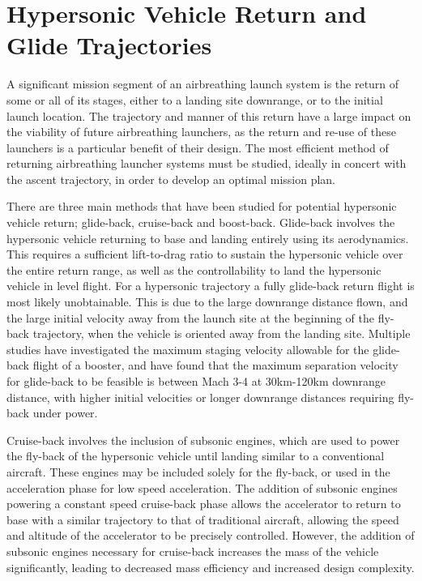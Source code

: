 \section{Hypersonic Vehicle Return and Glide Trajectories}


A significant mission segment of an airbreathing launch system is the return of some or all of its stages, either to a landing site downrange, or to the initial launch location. The trajectory and manner of this return have a large impact on the viability of future airbreathing launchers, as the return and re-use of these launchers is a particular benefit of their design\cite{Preller2017b}. The most efficient method of returning airbreathing launcher systems must be studied, ideally in concert with the ascent trajectory, in order to develop an optimal mission plan.  

There are three main methods that have been studied for potential hypersonic vehicle return; glide-back, cruise-back and boost-back. Glide-back involves the hypersonic vehicle returning to base and landing entirely using its aerodynamics. This requires a sufficient lift-to-drag ratio to sustain the hypersonic vehicle over the entire return range, as well as the controllability to land the hypersonic vehicle in level flight. 
For a hypersonic trajectory a fully glide-back return flight is most likely unobtainable. This is due to the large downrange distance flown, and the large initial velocity away from the launch site at the beginning of the fly-back trajectory, when the vehicle is oriented away from the landing site. Multiple studies have investigated the maximum staging velocity allowable for the glide-back flight of a booster, and have found that the maximum separation velocity for glide-back to be feasible is between Mach 3-4 at 30km-120km downrange distance, with higher initial velocities or longer downrange distances requiring fly-back under power\cite{Hellman,Tetlow1992}.

Cruise-back involves the inclusion of subsonic engines, which are used to power the fly-back of the hypersonic vehicle until landing similar to a conventional aircraft. These engines may be included solely for the fly-back\cite{Hellman}, or used in the acceleration phase for low speed acceleration\cite{Mehta2001,Tetlow1992,Wilhite1991}. The addition of subsonic engines powering a constant speed cruise-back phase allows the accelerator to return to base with a similar trajectory to that of traditional aircraft, allowing the speed and altitude of the accelerator to be precisely controlled. However, the addition of subsonic engines necessary for cruise-back increases the mass of the vehicle significantly, leading to decreased mass efficiency and increased design complexity\cite{Hellman}. 

